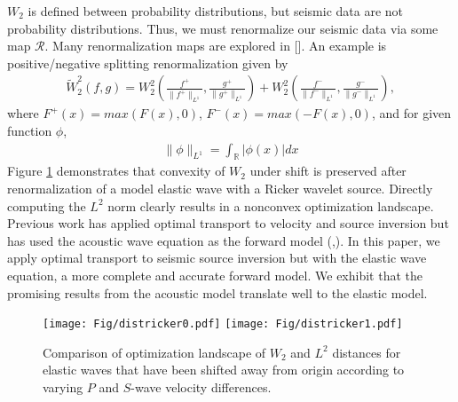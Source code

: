 \documentclass[paper,onecolumn,twoside]{geophysics}
\newcommand{\citensp}[1]{\hspace{1sp}\cite{#1}}
\newcommand{\R}{\mathbb{R}}
\begin{document}
$W_2$ is defined between probability distributions, but seismic data are not probability distributions. 
Thus, we must renormalize our seismic data via some map $\mathcal{R}$. Many renormalization maps are explored in [\citensp{engquist2020optimal}]. An example is positive/negative splitting renormalization given by
\begin{align}\label{eqn:w2tilde}
    \tilde{W}_{2}^{2}(f,g) = W_{2}^{2}\left( \frac{f^{+}}{\|f^{+}\|_{L^1}}, \frac{g^{+}}{\|g^{+}\|_{L^1}}\right) + W_{2}^{2}\left(\frac{f^{-}}{\|f^{-}\|_{L^1}}, \frac{g^{-}}{\|g^{-}\|_{L^1}}\right),
\end{align}
where $F^{+}(x) = max(F(x), 0)$, $F^{-}(x) = max(-F(x), 0)$, and for given function $\phi$,
\begin{align*}
    \|\phi\|_{L^1} = \int_{\R} |\phi(x)| dx
\end{align*}
Figure \ref{fig:ricker-madagascar} demonstrates that convexity of $W_2$ under shift is preserved after renormalization of a model elastic wave with a Ricker wavelet source. Directly computing the $L^2$ norm clearly results in a nonconvex optimization landscape. Previous work has applied optimal transport to velocity and source inversion but has used the acoustic wave equation as the forward model (\citensp{chen2018quadratic},\cite{yang2018application}). In this paper, we apply optimal transport to seismic source inversion but with the elastic wave equation, a more complete and accurate forward model. We exhibit that the promising results from the acoustic model translate well to the elastic model. 


\begin{figure}
\texttt{[image: Fig/districker0.pdf]}
\texttt{[image: Fig/districker1.pdf]}
\caption{Comparison of optimization landscape of $W_2$ and $L^2$ distances for elastic waves that have been shifted away from origin according to varying $P$ and $S$-wave velocity differences.}
\label{fig:ricker-madagascar}
\end{figure}
\end{document}
